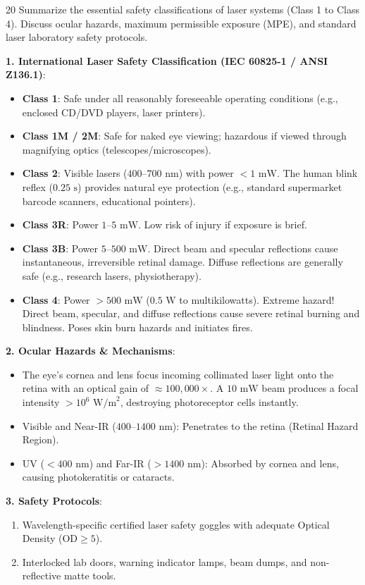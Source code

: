 \begin{theoryq}{20}
Summarize the essential safety classifications of laser systems (Class 1 to Class 4). Discuss ocular hazards, maximum permissible exposure (MPE), and standard laser laboratory safety protocols.
\end{theoryq}
\begin{theorysol}
\textbf{1. International Laser Safety Classification (IEC 60825-1 / ANSI Z136.1)}:
\begin{itemize}
    \item \textbf{Class 1}: Safe under all reasonably foreseeable operating conditions (e.g., enclosed CD/DVD players, laser printers).
    \item \textbf{Class 1M / 2M}: Safe for naked eye viewing; hazardous if viewed through magnifying optics (telescopes/microscopes).
    \item \textbf{Class 2}: Visible lasers ($400\text{--}700\text{ nm}$) with power $< 1\text{ mW}$. The human blink reflex ($0.25\text{ s}$) provides natural eye protection (e.g., standard supermarket barcode scanners, educational pointers).
    \item \textbf{Class 3R}: Power $1\text{--}5\text{ mW}$. Low risk of injury if exposure is brief.
    \item \textbf{Class 3B}: Power $5\text{--}500\text{ mW}$. Direct beam and specular reflections cause instantaneous, irreversible retinal damage. Diffuse reflections are generally safe (e.g., research lasers, physiotherapy).
    \item \textbf{Class 4}: Power $> 500\text{ mW}$ ($0.5\text{ W}$ to multikilowatts). Extreme hazard! Direct beam, specular, and diffuse reflections cause severe retinal burning and blindness. Poses skin burn hazards and initiates fires.
\end{itemize}

\textbf{2. Ocular Hazards \& Mechanisms}:
\begin{itemize}
    \item The eye's cornea and lens focus incoming collimated laser light onto the retina with an optical gain of $\approx 100,000\times$. A $10\text{ mW}$ beam produces a focal intensity $> 10^6\text{ W/m}^2$, destroying photoreceptor cells instantly.
    \item Visible and Near-IR ($400\text{--}1400\text{ nm}$): Penetrates to the retina (Retinal Hazard Region).
    \item UV ($< 400\text{ nm}$) and Far-IR ($> 1400\text{ nm}$): Absorbed by cornea and lens, causing photokeratitis or cataracts.
\end{itemize}

\textbf{3. Safety Protocols}:
\begin{enumerate}
    \item Wavelength-specific certified laser safety goggles with adequate Optical Density ($\text{OD} \ge 5$).
    \item Interlocked lab doors, warning indicator lamps, beam dumps, and non-reflective matte tools.
\end{enumerate}
\end{theorysol}
\vspace{4mm}
